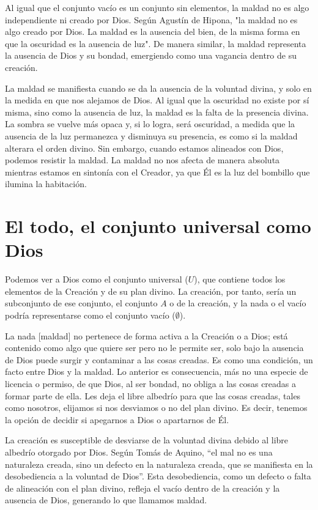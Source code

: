 \documentclass[letterpaper,13pt]{article}
\begin{document}
Al igual que el conjunto vacío es un conjunto sin elementos, la maldad no es algo independiente ni creado por Dios. Según Agustín de Hipona, "la maldad no es algo creado por Dios. La maldad es la ausencia del bien, de la misma forma en que la oscuridad es la ausencia de luz". De manera similar, la maldad representa la ausencia de Dios y su bondad, emergiendo como una vagancia dentro de su creación.

La maldad se manifiesta cuando se da la ausencia de la voluntad divina, y solo en la medida en que nos alejamos de Dios. Al igual que la oscuridad no existe por sí misma, sino como la ausencia de luz, la maldad es la falta de la presencia divina. La sombra se vuelve más opaca y, si lo logra, será oscuridad, a medida que la ausencia de la luz permanezca y disminuya su presencia, es como si la maldad alterara el orden divino. Sin embargo, cuando estamos alineados con Dios, podemos resistir la maldad. La maldad no nos afecta de manera absoluta mientras estamos en sintonía con el Creador, ya que Él es la luz del bombillo que ilumina la habitación.

\section{El todo, el conjunto universal como Dios}

Podemos ver a Dios como el conjunto universal (\( U \)), que contiene todos los elementos de la Creación y de su plan divino. La creación, por tanto, sería un subconjunto de ese conjunto, el conjunto \( A \) o de la creación, y la nada o el vacío podría representarse como el conjunto vacío (\( \emptyset \)).

La nada [maldad] no pertenece de forma activa a la Creación o a Dios; está contenido como algo que quiere ser pero no le permite ser, solo bajo la ausencia de Dios puede surgir y contaminar a las cosas creadas. Es como una condición, un facto entre Dios y la maldad. Lo anterior es consecuencia, más no una especie de licencia o permiso, de que Dios, al ser bondad, no obliga a las cosas creadas a formar parte de ella. Les deja el libre albedrío para que las cosas creadas, tales como nosotros, elijamos si nos desviamos o no del plan divino. Es decir, tenemos la opción de decidir si apegarnos a Dios o apartarnos de Él.

La creación es susceptible de desviarse de la voluntad divina debido al libre albedrío otorgado por Dios. Según Tomás de Aquino, \textquotedblleft el mal no es una naturaleza creada, sino un defecto en la naturaleza creada, que se manifiesta en la desobediencia a la voluntad de Dios\textquotedblright. Esta desobediencia, como un defecto o falta de alineación con el plan divino, refleja el vacío dentro de la creación y la ausencia de Dios, generando lo que llamamos maldad.
\end{document}
